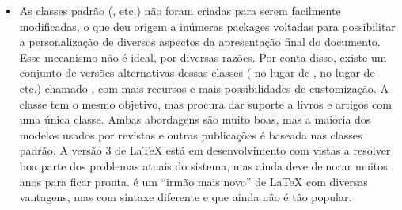 \begin{itemize}

    \item As classes padrão (,  etc.) não foram criadas
    para serem facilmente modificadas, o que deu origem a inúmeras packages
    voltadas para possibilitar a personalização de diversos aspectos da
    apresentação final do documento. Esse mecanismo não é ideal, por diversas
    razões. Por conta disso, existe um conjunto de versões alternativas dessas
    classes ( no lugar de ,  no lugar de
     etc.) chamado , com mais recursos e mais
    possibilidades de customização. A classe  tem o mesmo objetivo,
    mas procura dar suporte a livros e artigos com uma única classe. Ambas
    abordagens são muito boas, mas a maioria dos modelos usados por revistas e
    outras publicações é baseada nas classes padrão. A versão 3 de \LaTeX{}
    está em desenvolvimento com vistas a resolver boa parte dos problemas
    atuais do sistema, mas ainda deve demorar muitos anos para ficar pronta.
    \ConTeXt{} é um ``irmão mais novo'' de \LaTeX{} com diversas
    vantagens, mas com sintaxe diferente e que ainda não é tão popular.
\end{itemize}

